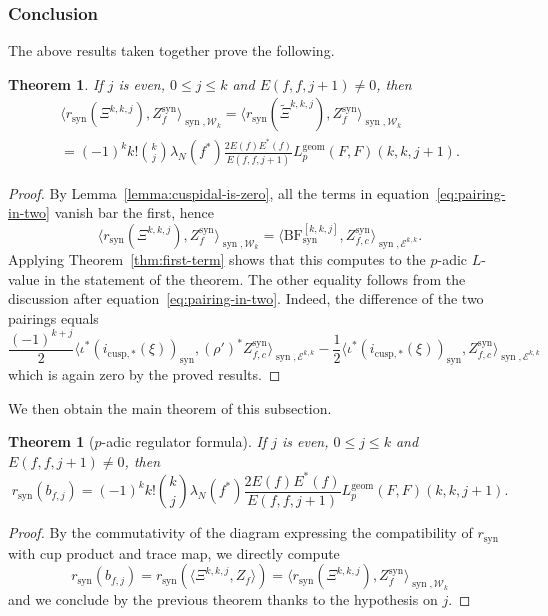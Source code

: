 \documentclass[11pt, a4paper, reqno]{amsart}
\theoremstyle{definition}
\theoremstyle{plain}
\newtheorem{theorem}[definition]{Theorem}
\theoremstyle{remark}
\DeclareMathOperator{\syn}{syn}
\newcommand{\Ell}{\mathcal{E}}
\newcommand{\KS}{\mathscr{W}}
\newcommand{\BF}{\mathrm{BF}}
\newcommand{\lcBF}{\widetilde{\Xi}}
\newcommand{\cBF}{\Xi}
\newcommand{\regulator}[1]{r_{#1}}
\newcommand{\rsyn}{\regulator{\syn}}
\newcommand{\Lgeom}{L_p^{\mathrm{geom}}}
\renewcommand{\le}{\leqslant}
\renewcommand{\leq}{\le}
\begin{document}
\subsubsection*{Conclusion}
The above results taken together prove the following.
\begin{theorem}
    If $j$ is even, $0\leq j\leq k$ and $E(f,f,j+1)\neq 0$, then
\begin{multline*}
    \langle \rsyn(\cBF^{k,k,j}),Z_f^{\syn} \rangle_{\syn, \KS_k} = \langle \rsyn(\lcBF^{k,k,j}),Z_f^{\syn} \rangle_{\syn, \KS_k} \\
 = (-1)^k k!\binom{k}{j}\lambda_N(f^*)\frac{2E(f)E^*(f)}{E(f,f,j+1)}\Lgeom(F,F)(k,k,j+1).
\end{multline*}
\end{theorem}
\begin{proof}
    By Lemma~\ref{lemma:cuspidal-is-zero}, all the terms in equation~\eqref{eq:pairing-in-two} vanish bar the first, hence
    \[
        \langle \rsyn(\cBF^{k,k,j}),Z_f^{\syn} \rangle_{\syn, \KS_k} = \langle \BF^{[k,k,j]}_{\syn}, Z_{f,c}^{\syn} \rangle_{\syn,\Ell^{k, k}}.
    \]
    Applying Theorem~\ref{thm:first-term} shows that this computes to the $p$-adic $L$-value in the statement of the theorem. The other equality follows from the discussion after equation~\eqref{eq:pairing-in-two}. Indeed, the difference of the two pairings equals
    \[
        \frac{(-1)^{k+j}}{2}\langle \iota^*(i_{\mathrm{cusp},*}(\xi))_{\syn}, (\rho')^* Z_{f,c}^{\syn} \rangle_{\syn,\Ell^{k,k}} - \frac{1}{2}\langle \iota^*(i_{\mathrm{cusp},*}(\xi))_{\syn}, Z_{f,c}^{\syn} \rangle_{\syn,\Ell^{k,k}}
    \]
    which is again zero by the proved results.
\end{proof}

We then obtain the main theorem of this subsection.

\begin{theorem}[$p$-adic regulator formula]
    \label{thm:syntomic-l-value}
    If $j$ is even, $0\leq j\leq k$ and $E(f,f,j+1)\neq 0$, then
    \[
  \rsyn(b_{f, j}) = (-1)^k k!\binom{k}{j}\lambda_N(f^*)\frac{2E(f)E^*(f)}{E(f,f,j+1)}\Lgeom(F,F)(k,k,j+1).
    \]
\end{theorem}

\begin{proof}
    By the commutativity of the diagram expressing the compatibility of $\rsyn$ with cup product and trace map, we directly compute
    \[
        \rsyn(b_{f, j}) = \rsyn(\langle \cBF^{k,k,j}, Z_f\rangle) = \langle \rsyn(\cBF^{k,k,j}),Z_f^{\syn} \rangle_{\syn,\KS_k}
    \]
    and we conclude by the previous theorem thanks to the hypothesis on $j$.
\end{proof}
\end{document}
